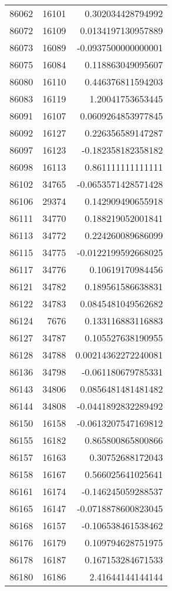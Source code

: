 \begin{tabular}{r | r | r}
86062 & 16101 & 0.302034428794992 \\
86072 & 16109 & 0.0134197130957889 \\
86073 & 16089 & -0.0937500000000001 \\
86075 & 16084 & 0.118863049095607 \\
86080 & 16110 & 0.446376811594203 \\
86083 & 16119 & 1.20041753653445 \\
86091 & 16107 & 0.0609264853977845 \\
86092 & 16127 & 0.226356589147287 \\
86097 & 16123 & -0.182358182358182 \\
86098 & 16113 & 0.861111111111111 \\
86102 & 34765 & -0.0653571428571428 \\
86106 & 29374 & 0.142909490655918 \\
86111 & 34770 & 0.188219052001841 \\
86113 & 34772 & 0.224260089686099 \\
86115 & 34775 & -0.0122199592668025 \\
86117 & 34776 & 0.10619170984456 \\
86121 & 34782 & 0.189561586638831 \\
86122 & 34783 & 0.0845481049562682 \\
86124 & 7676 & 0.133116883116883 \\
86127 & 34787 & 0.105527638190955 \\
86128 & 34788 & 0.00214362272240081 \\
86136 & 34798 & -0.061180679785331 \\
86143 & 34806 & 0.0856481481481482 \\
86144 & 34808 & -0.0441892832289492 \\
86150 & 16158 & -0.0613207547169812 \\
86155 & 16182 & 0.865800865800866 \\
86157 & 16163 & 0.30752688172043 \\
86158 & 16167 & 0.566025641025641 \\
86161 & 16174 & -0.146245059288537 \\
86165 & 16147 & -0.0718878600823045 \\
86168 & 16157 & -0.106538461538462 \\
86176 & 16179 & 0.109794628751975 \\
86178 & 16187 & 0.167153284671533 \\
86180 & 16186 & 2.41644144144144 \\

\end{tabular}
